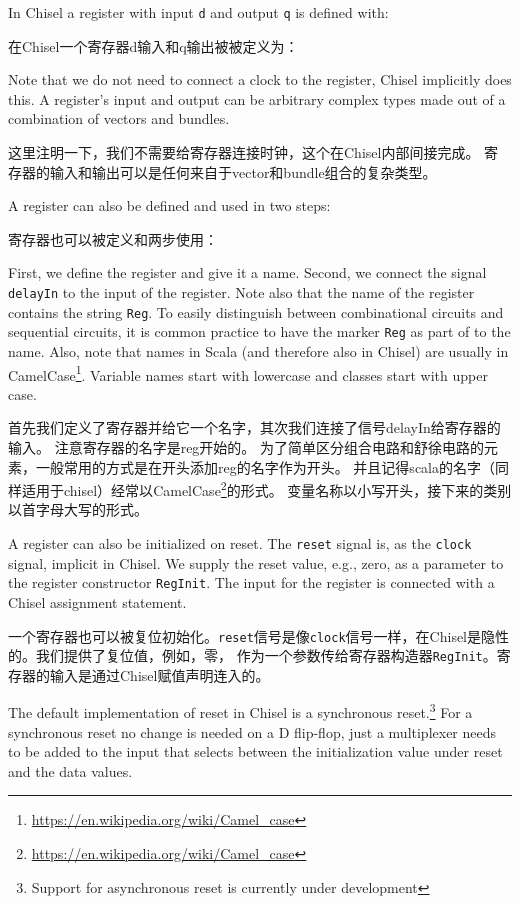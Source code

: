 \documentclass[%
    10pt,
    headinclude, footexclude,
    openright, %
    notitlepage,
    cleardoubleempty,
    headsepline,
    pointlessnumbers,
    bibtotoc, idxtotoc,
    ]{scrbook}
\newcommand{\code}[1]{{\small{\texttt{#1}}}}
\newcommand{\myref}[2]{\href{#1}{#2}}
\renewcommand{\myref}[2]{{#2}{\footnote{\url{#1}}}}
\begin{document}
In Chisel a register with input \code{d} and output \code{q} is defined with:

在Chisel一个寄存器d输入和q输出被被定义为：


\noindent Note that we do not need to connect a clock to the register, Chisel implicitly does this.
A register's input and output can be arbitrary complex types
made out of a combination of vectors and bundles.

这里注明一下，我们不需要给寄存器连接时钟，这个在Chisel内部间接完成。 
寄存器的输入和输出可以是任何来自于vector和bundle组合的复杂类型。


A register can also be defined and used in two steps:

寄存器也可以被定义和两步使用：


First, we define the register and give it a name. Second, we connect the signal
\code{delayIn} to the input of the register. Note also that the name of the register
contains the string \code{Reg}. To easily distinguish between combinational
circuits and sequential circuits, it is common practice to have the marker
\code{Reg} as part of to the name. Also, note that names in Scala (and therefore
also in Chisel) are usually in
\myref{https://en.wikipedia.org/wiki/Camel_case}{CamelCase}.
Variable names start with lowercase and classes start with upper case.

首先我们定义了寄存器并给它一个名字，其次我们连接了信号delayIn给寄存器的输入。
注意寄存器的名字是reg开始的。
为了简单区分组合电路和舒徐电路的元素，一般常用的方式是在开头添加reg的名字作为开头。
并且记得scala的名字（同样适用于chisel）经常以\myref{https://en.wikipedia.org/wiki/Camel_case}{CamelCase}的形式。
变量名称以小写开头，接下来的类别以首字母大写的形式。

A register can also be initialized on reset. The \code{reset} signal is, as the \code{clock} signal,
implicit in Chisel. We supply the reset value, e.g., zero, as a parameter to the register
constructor \code{RegInit}. The input for the register is connected with a Chisel
assignment statement.

一个寄存器也可以被复位初始化。\code{reset}信号是像\code{clock}信号一样，在Chisel是隐性的。我们提供了复位值，例如，零，
作为一个参数传给寄存器构造器\code{RegInit}。寄存器的输入是通过Chisel赋值声明连入的。


The default implementation of reset in Chisel is a synchronous
reset.\footnote{Support for asynchronous reset is currently under development}
For a synchronous reset no change is needed on a D flip-flop, just a multiplexer
needs to be added to the input that selects between the initialization value under
reset and the data values.
\end{document}
